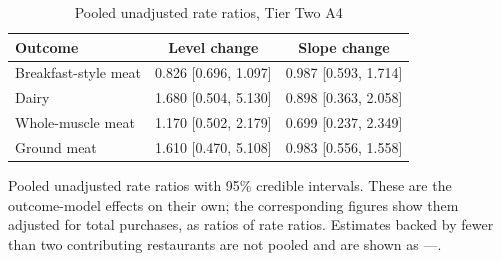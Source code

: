 \begin{table}[H]
\centering
\caption{Pooled unadjusted rate ratios, Tier Two A4}
\label{tab:rr_t2_a4}
\begin{tabular}{lcc}
\toprule
Outcome & Level change & Slope change \\
\midrule
Breakfast-style meat & 0.826 [0.696, 1.097] & 0.987 [0.593, 1.714] \\
Dairy & 1.680 [0.504, 5.130] & 0.898 [0.363, 2.058] \\
Whole-muscle meat & 1.170 [0.502, 2.179] & 0.699 [0.237, 2.349] \\
Ground meat & 1.610 [0.470, 5.108] & 0.983 [0.556, 1.558] \\
\bottomrule
\end{tabular}
\par\smallskip\footnotesize Pooled unadjusted rate ratios with 95\% credible intervals. These are the outcome-model effects on their own; the corresponding figures show them adjusted for total purchases, as ratios of rate ratios. Estimates backed by fewer than two contributing restaurants are not pooled and are shown as ---.
\end{table}
